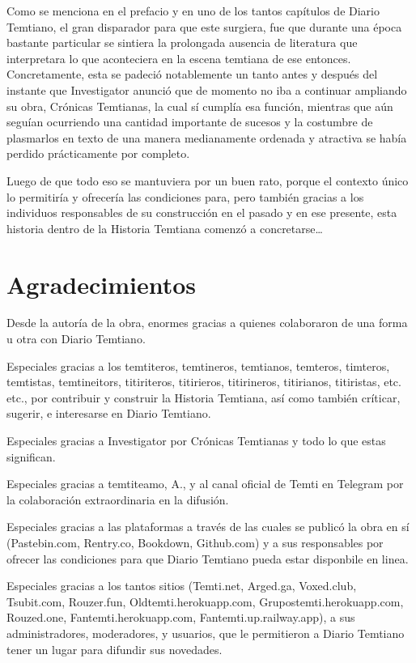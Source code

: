 \documentclass[
]{book}
\begin{document}
Como se menciona en el prefacio y en uno de los tantos capítulos de Diario Temtiano, el gran disparador para que este surgiera, fue que durante una época bastante particular se sintiera la prolongada ausencia de literatura que interpretara lo que aconteciera en la escena temtiana de ese entonces. Concretamente, esta se padeció notablemente un tanto antes y después del instante que Investigator anunció que de momento no iba a continuar ampliando su obra, Crónicas Temtianas, la cual sí cumplía esa función, mientras que aún seguían ocurriendo una cantidad importante de sucesos y la costumbre de plasmarlos en texto de una manera medianamente ordenada y atractiva se había perdido prácticamente por completo.

Luego de que todo eso se mantuviera por un buen rato, porque el contexto único lo permitiría y ofrecería las condiciones para, pero también gracias a los individuos responsables de su construcción en el pasado y en ese presente, esta historia dentro de la Historia Temtiana comenzó a concretarse\ldots{}

\hypertarget{agradecimientos}{%
\section*{Agradecimientos}\label{agradecimientos}}

Desde la autoría de la obra, enormes gracias a quienes colaboraron de una forma u otra con Diario Temtiano.

Especiales gracias a los temtiteros, temtineros, temtianos, temteros, timteros, temtistas, temtineitors, titiriteros, titirieros, titirineros, titirianos, titiristas, etc. etc., por contribuir y construir la Historia Temtiana, así como también críticar, sugerir, e interesarse en Diario Temtiano.

Especiales gracias a Investigator por Crónicas Temtianas y todo lo que estas significan.

Especiales gracias a temtiteamo, A., y al canal oficial de Temti en Telegram por la colaboración extraordinaria en la difusión.

Especiales gracias a las plataformas a través de las cuales se publicó la obra en sí (Pastebin.com, Rentry.co, Bookdown, Github.com) y a sus responsables por ofrecer las condiciones para que Diario Temtiano pueda estar disponbile en linea.

Especiales gracias a los tantos sitios (Temti.net, Arged.ga, Voxed.club, Tsubit.com, Rouzer.fun, Oldtemti.herokuapp.com, Grupostemti.herokuapp.com, Rouzed.one, Fantemti.herokuapp.com, Fantemti.up.railway.app), a sus administradores, moderadores, y usuarios, que le permitieron a Diario Temtiano tener un lugar para difundir sus novedades.
\end{document}
